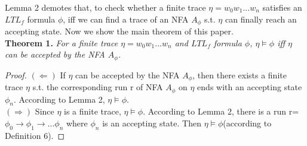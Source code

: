 Lemma 2 demotes that, to check whether a finite trace $\eta = w_0 w_1 ... w_n$ satisfies an $LTL_f$ formula $\phi$, iff we can find a trace of an NFA $A_\phi$ s.t. $\eta$ can finally reach an accepting state. Now we show the main theorem of this paper.\\
{\bf Theorem 1.}  {\it For a finite trace  $\eta = w_0w_1...w_n $ and $LTL_f$ formula $\phi$, $\eta \models \phi$ iff $\eta$ can be accepted by the NFA $A_\phi$.}
\begin{proof} $(\Leftarrow)$ If $\eta$ can be accepted by the NFA $A_{\phi}$, then there exists a finite trace $\eta$ s.t. the corresponding run r of NFA $A_{\phi}$ on $\eta$ ends with  an accepting state $\phi_n$. According to Lemma 2, $\eta \models \phi$. \\
$(\Rightarrow)$ Since $\eta$ is a finite trace, $\eta \models \phi$. According to Lemma 2, there is a run r= $\phi_0 \to \phi_1 \to ...\phi_n$ where $\phi_n$ is an accepting state. Then $\eta \models \phi$(according to Definition 6).
\end{proof}

